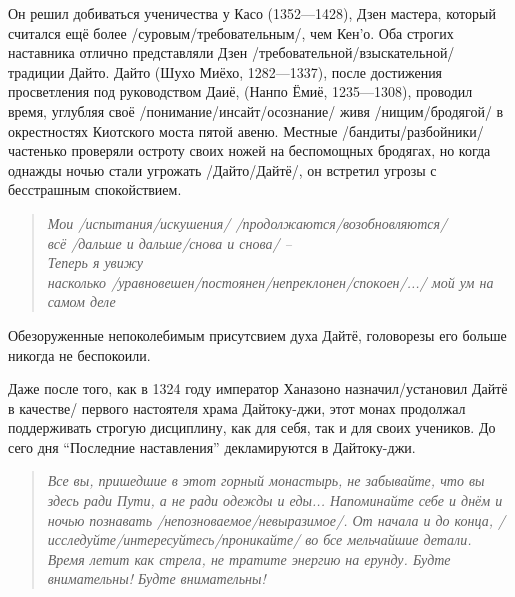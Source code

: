 \begin{ver}
  Он решил добиваться ученичества у Касо (1352---1428), Дзен мастера,
  который считался ещё более /суровым/требовательным/, чем Кен'о. Оба
  строгих наставника отлично представляли Дзен
  /требовательной/взыскательной/ традиции Дайто. Дайто (Шухо Миёхо,
  1282---1337), после достижения просветления под руководством Даиё,
  (Нанпо Ёмиё, 1235---1308), проводил время, углубляя своё
  /понимание/инсайт/осознание/ живя /нищим/бродягой/ в окрестностях Киотского
  моста пятой авеню.  Местные /бандиты/разбойники/ частенько проверяли
  остроту своих ножей на беспомощных бродягах, но когда однажды ночью
  стали угрожать /Дайто/Дайтё/, он встретил угрозы с бесстрашным
  спокойствием. 
  \begin{verse}\it
    Мои /испытания/искушения/ /продолжаются/возобновляются/\\
    всё /дальше и дальше/снова и снова/ --\\
    Теперь я увижу\\
    насколько /уравновешен/постоянен/непреклонен/спокоен/.../
    мой ум на самом деле    
  \end{verse}
Обезоруженные непоколебимым присутсвием духа Дайтё, головорезы его
больше никогда не беспокоили.

Даже после того, как в 1324 году император Ханазоно
назначил/установил Дайтё в качестве/ первого настоятеля храма
Дайтоку-джи, этот монах продолжал поддерживать строгую дисциплину, как
для себя, так и для своих учеников. До сего дня ``Последние
наставления'' декламируются в Дайтоку-джи.

\begin{quote}\it
  Все вы, пришедшие в этот горный монастырь, не забывайте, что вы
  здесь ради Пути, а не ради одежды и еды... Напоминайте себе и днём и
  ночью познавать /непозноваемое/невыразимое/. От начала и до конца,
  /исследуйте/интересуйтесь/проникайте/ во бсе мельчайшие
  детали. Время летит как стрела, не тратите энергию на
  ерунду. Будте внимательны! Будте внимательны!


\end{quote}
\end{ver}
